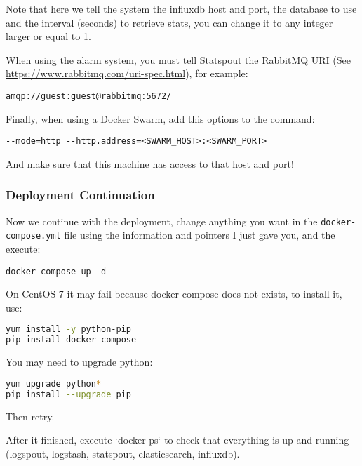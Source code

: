 Note that here we tell the system the influxdb host and port, the database to use and the interval (seconds) to retrieve stats, you can change it to any integer larger or equal to 1.

When using the alarm system, you must tell Statspout the RabbitMQ URI (See \url{https://www.rabbitmq.com/uri-spec.html}), for example:

\begin{lstlisting}
amqp://guest:guest@rabbitmq:5672/
\end{lstlisting}

Finally, when using a Docker Swarm, add this options to the command:

\begin{lstlisting}
--mode=http --http.address=<SWARM_HOST>:<SWARM_PORT>
\end{lstlisting}

And make sure that this machine has access to that host and port!

\subsubsection{Deployment Continuation}

Now we continue with the deployment, change anything you want in the \texttt{docker-compose.yml} file using the information and pointers I just gave you, and the execute:

\begin{lstlisting}
docker-compose up -d
\end{lstlisting}

\begin{story}
On CentOS 7 it may fail because docker-compose does not exists, to install it, use:

\begin{lstlisting}[language=bash]
yum install -y python-pip
pip install docker-compose
\end{lstlisting}

You may need to upgrade python:

\begin{lstlisting}[language=bash]
yum upgrade python*
pip install --upgrade pip
\end{lstlisting}

Then retry.
\end{story}

After it finished, execute `docker ps` to check that everything is up and running (logspout, logstash, statspout, elasticsearch, influxdb).

